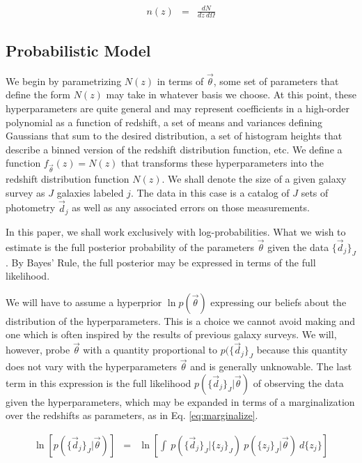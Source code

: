 \documentclass[preprint]{aastex}
\begin{document}
\begin{eqnarray}
\label{eq:density}
n(z) &=& \frac{dN}{dz\ d\Omega}
\end{eqnarray}

\clearpage
\subsection{Probabilistic Model}
\label{sec:prob}

We begin by parametrizing $N(z)$ in terms of $\vec{\theta}$, some set of 
parameters that define the form $N(z)$ may take in whatever basis we choose.  
At this point, these hyperparameters are quite general and may represent 
coefficients in a high-order polynomial as a function of redshift, a set of 
means and variances defining Gaussians that sum to the desired distribution, a 
set of histogram heights that describe a binned version of the redshift 
distribution function, etc.  We define a function $f_{\vec{\theta}}(z)=N(z)$ 
that transforms these hyperparameters into the redshift distribution function 
$N(z)$.  We shall denote the size of a given galaxy survey as $J$ galaxies 
labeled $j$.  The data in this case is a catalog of $J$ sets of photometry 
$\vec{d}_{j}$ as well as any associated errors on those measurements.  

In this paper, we shall work exclusively with log-probabilities.  What we wish 
to estimate is the full posterior probability of the parameters $\vec{\theta}$ 
given the data $\{\vec{d}_{j}\}_{J}$.  By Bayes' Rule, the full posterior may 
be expressed in terms of the full likelihood.

We will have to assume a hyperprior $\ln p(\vec{\theta})$ expressing our 
beliefs about the distribution of the hyperparameters.  This is a choice we 
cannot avoid making and one which is often inspired by the results of previous 
galaxy surveys.  We will, however, probe $\vec{\theta}$ with a quantity 
proportional to $p(\{\vec{d}_{j}\}_{J}$ because this quantity does not vary 
with the hyperparameters $\vec{\theta}$ and is generally unknowable.  The last 
term in this expression is the full likelihood 
$p(\{\vec{d}_{j}\}_{J}|\vec{\theta})$ of observing the data given the 
hyperparameters, which may be expanded in terms of a marginalization over the 
redshifts as parameters, as in Eq. \ref{eq:marginalize}.  

\begin{eqnarray}
\label{eq:marginalize}
\ln[p(\{\vec{d}_{j}\}_{J}|\vec{\theta})] &=& \ln\left[\int\ 
p(\{\vec{d}_{j}\}_{J}|\{z_{j}\}_{J})\ p(\{z_{j}\}_{J}|\vec{\theta})\ 
d\{z_{j}\}\right]
\end{eqnarray}
\end{document}
